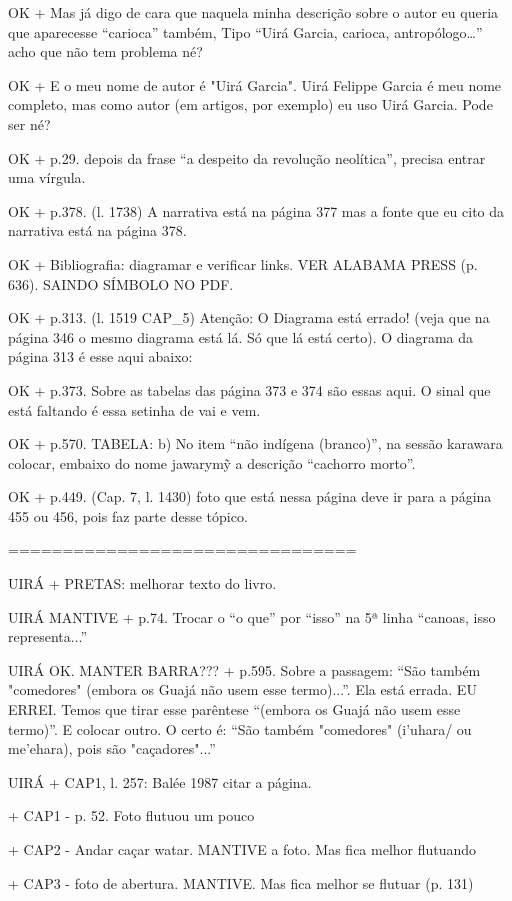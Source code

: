 OK + Mas já digo de cara que naquela minha descrição sobre o autor eu queria que aparecesse “carioca” também, Tipo “Uirá Garcia, carioca, antropólogo…” acho que não tem problema né?

OK + E o meu nome de autor é "Uirá Garcia". Uirá Felippe Garcia é meu nome completo, mas como autor (em artigos, por exemplo) eu uso Uirá Garcia. Pode ser né?

OK + p.29. depois da frase “a despeito da revolução neolítica”, precisa entrar uma vírgula.

OK + p.378. (l. 1738) A narrativa está na página 377 mas a fonte que eu cito da narrativa está na página 378.

OK + Bibliografia: diagramar e verificar links. VER ALABAMA PRESS (p. 636). SAINDO SÍMBOLO NO PDF.

OK + p.313. (l. 1519 CAP_5) Atenção: O Diagrama está errado! (veja que na página 346 o mesmo diagrama está lá. Só que lá está certo). O diagrama da página 313 é esse aqui abaixo:

OK + p.373. Sobre as tabelas das página 373 e 374 são essas aqui. O sinal que está faltando é essa setinha de vai e vem.

OK + p.570. TABELA: 
b) No item “não indígena (branco)”, na sessão karawara colocar, embaixo do nome jawarymỹ a descrição “cachorro morto”.

OK + p.449. (Cap. 7, l. 1430) foto que está nessa página deve ir para a página 455 ou 456, pois faz parte desse tópico.

================================

UIRÁ + PRETAS: melhorar texto do livro.

UIRÁ MANTIVE + p.74. Trocar o “o que” por “isso” na 5ª linha “canoas, isso representa...”

UIRÁ OK. MANTER BARRA??? + p.595. Sobre a passagem: “São também "comedores" (embora os Guajá não usem esse termo)...”. Ela está errada. EU ERREI. Temos que tirar esse parêntese “(embora os Guajá não usem esse termo)”. E colocar outro. O certo é: “São também "comedores" (i’uhara/ ou me’ehara), pois são "caçadores"...”

UIRÁ + CAP1, l. 257: Balée 1987 citar a página.

+ CAP1 - p. 52. Foto flutuou um pouco

+ CAP2 - Andar caçar watar. MANTIVE a foto. Mas fica melhor flutuando

+ CAP3 - foto de abertura. MANTIVE. Mas fica melhor se flutuar (p. 131)

